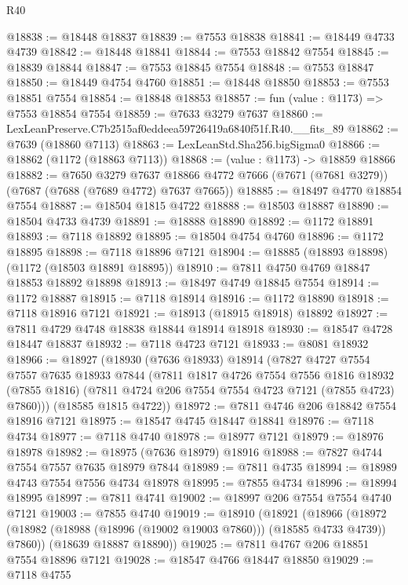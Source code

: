 \begin{lexlean}{R40}
\begin{coremodule}
@18838 := @18448 @18837
@18839 := @7553 @18838
@18841 := @18449 @4733 @4739
@18842 := @18448 @18841
@18844 := @7553 @18842 @7554
@18845 := @18839 @18844
@18847 := @7553 @18845 @7554
@18848 := @7553 @18847
@18850 := @18449 @4754 @4760
@18851 := @18448 @18850
@18853 := @7553 @18851 @7554
@18854 := @18848 @18853
@18857 := fun (value : @1173) => @7553 @18854 @7554
@18859 := @7633 @3279 @7637
@18860 := LexLeanPreserve.C7b2515af0eddeea59726419a6840f51f.R40.__fits_89
@18862 := @7639 (@18860 @7113)
@18863 := LexLeanStd.Sha256.bigSigma0
@18866 := @18862 (@1172 (@18863 @7113))
@18868 := (value : @1173) -> @18859 @18866
@18882 := @7650
    @3279
    @7637
    @18866
    @4772
    @7666
    (@7671 (@7681 @3279))
    (@7687 (@7688 (@7689 @4772) @7637 @7665))
@18885 := @18497 @4770 @18854 @7554
@18887 := @18504 @1815 @4722
@18888 := @18503 @18887
@18890 := @18504 @4733 @4739
@18891 := @18888 @18890
@18892 := @1172 @18891
@18893 := @7118 @18892
@18895 := @18504 @4754 @4760
@18896 := @1172 @18895
@18898 := @7118 @18896 @7121
@18904 := @18885 (@18893 @18898) (@1172 (@18503 @18891 @18895))
@18910 := @7811 @4750 @4769 @18847 @18853 @18892 @18898
@18913 := @18497 @4749 @18845 @7554
@18914 := @1172 @18887
@18915 := @7118 @18914
@18916 := @1172 @18890
@18918 := @7118 @18916 @7121
@18921 := @18913 (@18915 @18918) @18892
@18927 := @7811 @4729 @4748 @18838 @18844 @18914 @18918
@18930 := @18547 @4728 @18447 @18837
@18932 := @7118 @4723 @7121
@18933 := @8081 @18932
@18966 := @18927
    (@18930
      (@7636 @18933)
      @18914
      (@7827
        @4727
        @7554
        @7557
        @7635
        @18933
        @7844
        (@7811
          @1817
          @4726
          @7554
          @7556
          @1816
          @18932
          (@7855 @1816)
          (@7811 @4724 @206 @7554 @7554 @4723 @7121 (@7855 @4723) @7860)))
      (@18585 @1815 @4722))
@18972 := @7811 @4746 @206 @18842 @7554 @18916 @7121
@18975 := @18547 @4745 @18447 @18841
@18976 := @7118 @4734
@18977 := @7118 @4740
@18978 := @18977 @7121
@18979 := @18976 @18978
@18982 := @18975 (@7636 @18979) @18916
@18988 := @7827 @4744 @7554 @7557 @7635 @18979 @7844
@18989 := @7811 @4735
@18994 := @18989 @4743 @7554 @7556 @4734 @18978
@18995 := @7855 @4734
@18996 := @18994 @18995
@18997 := @7811 @4741
@19002 := @18997 @206 @7554 @7554 @4740 @7121
@19003 := @7855 @4740
@19019 := @18910
    (@18921
      (@18966 (@18972 (@18982 (@18988 (@18996 (@19002 @19003 @7860))) (@18585 @4733 @4739)) @7860))
      (@18639 @18887 @18890))
@19025 := @7811 @4767 @206 @18851 @7554 @18896 @7121
@19028 := @18547 @4766 @18447 @18850
@19029 := @7118 @4755

\end{coremodule}
\end{lexlean}
